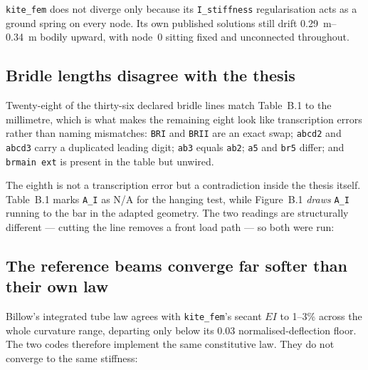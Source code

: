 \documentclass[11pt,a4paper]{article}
\begin{document}
\texttt{kite\_fem} does not diverge only because its \texttt{I\_stiffness}
regularisation acts as a ground spring on every node. Its own published
solutions still drift \SIrange{0.29}{0.34}{m} bodily upward, with node~0 sitting
fixed and unconnected throughout.

\subsection{Bridle lengths disagree with the thesis}

Twenty-eight of the thirty-six declared bridle lines match Table~B.1 to the
millimetre, which is what makes the remaining eight look like transcription
errors rather than naming mismatches: \texttt{BRI} and \texttt{BRII} are an
exact swap; \texttt{abcd2} and \texttt{abcd3} carry a duplicated leading digit;
\texttt{ab3} equals \texttt{ab2}; \texttt{a5} and \texttt{br5} differ; and
\texttt{brmain ext} is present in the table but unwired.

The eighth is not a transcription error but a contradiction inside the thesis
itself. Table~B.1 marks \texttt{A\_I} as N/A for the hanging test, while
Figure~B.1 \emph{draws} \texttt{A\_I} running to the bar in the adapted
geometry. The two readings are structurally different --- cutting the line
removes a front load path --- so both were run:

\begin{table}[htbp]
\centering
\caption{Three readings of the same source. Cutting \texttt{A\_I} is the most
accurate reading on the cases the model can solve and the worst overall,
because removing that load path is what lets the four centre-load cases fall
into a folded local minimum. No reading is adopted here: the ambiguity is a
finding about the source data, not something to settle by taking whichever
scores best.}

\end{table}

\subsection{The reference beams converge far softer than their own law}

Billow's integrated tube law agrees with \texttt{kite\_fem}'s secant $EI$ to
1--3\% across the whole curvature range, departing only below its
\num{0.03} normalised-deflection floor. The two codes therefore implement the
same constitutive law. They do not converge to the same stiffness:
\end{document}
